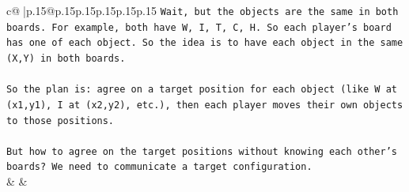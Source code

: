 \documentclass{article}
\begin{document}
{\begin{supertabular}{c@{$\;$}|p{.15\linewidth}@{}p{.15\linewidth}p{.15\linewidth}p{.15\linewidth}p{.15\linewidth}p{.15\linewidth}}
{{{\texttt{Wait, but the objects are the same in both boards. For example, both have W, I, T, C, H. So each player's board has one of each object. So the idea is to have each object in the same (X,Y) in both boards.} \\
\\ 
\texttt{So the plan is: agree on a target position for each object (like W at (x1,y1), I at (x2,y2), etc.), then each player moves their own objects to those positions.} \\
\\ 
\texttt{But how to agree on the target positions without knowing each other's boards? We need to communicate a target configuration.} \\
            }
        }
    }
    & & \\ \\


\end{supertabular}}
\end{document}
